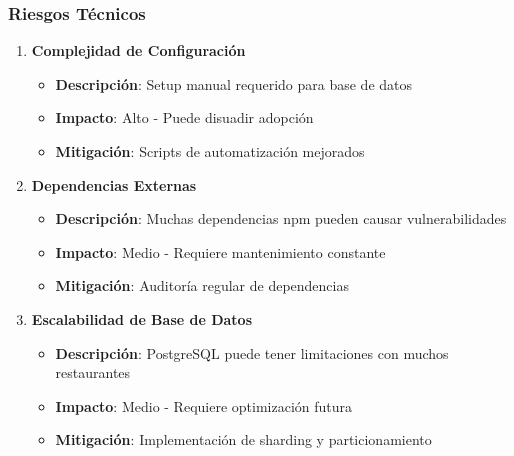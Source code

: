 \documentclass[12pt,a4paper]{article}
\begin{document}
\subsubsection{Riesgos Técnicos}
\begin{enumerate}
    \item \textbf{Complejidad de Configuración}
    \begin{itemize}
        \item \textbf{Descripción}: Setup manual requerido para base de datos
        \item \textbf{Impacto}: Alto - Puede disuadir adopción
        \item \textbf{Mitigación}: Scripts de automatización mejorados
    \end{itemize}
    
    \item \textbf{Dependencias Externas}
    \begin{itemize}
        \item \textbf{Descripción}: Muchas dependencias npm pueden causar vulnerabilidades
        \item \textbf{Impacto}: Medio - Requiere mantenimiento constante
        \item \textbf{Mitigación}: Auditoría regular de dependencias
    \end{itemize}
    
    \item \textbf{Escalabilidad de Base de Datos}
    \begin{itemize}
        \item \textbf{Descripción}: PostgreSQL puede tener limitaciones con muchos restaurantes
        \item \textbf{Impacto}: Medio - Requiere optimización futura
        \item \textbf{Mitigación}: Implementación de sharding y particionamiento
    \end{itemize}
\end{enumerate}
\end{document}

